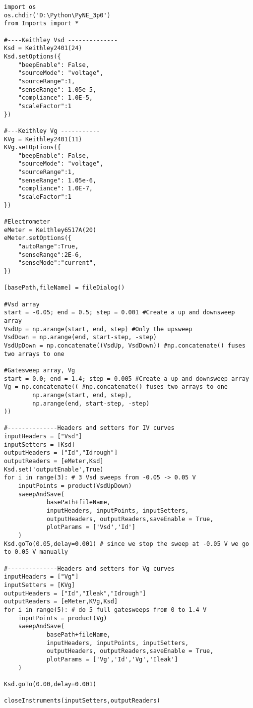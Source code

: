 \scriptsize
\begin{verbatim}
import os
os.chdir('D:\Python\PyNE_3p0')
from Imports import *

#----Keithley Vsd --------------
Ksd = Keithley2401(24)
Ksd.setOptions({
    "beepEnable": False,
    "sourceMode": "voltage",
    "sourceRange":1,
    "senseRange": 1.05e-5,
    "compliance": 1.0E-5,
    "scaleFactor":1
})

#---Keithley Vg -----------
KVg = Keithley2401(11)
KVg.setOptions({
    "beepEnable": False,
    "sourceMode": "voltage",
    "sourceRange":1,
    "senseRange": 1.05e-6,
    "compliance": 1.0E-7,
    "scaleFactor":1
})

#Electrometer
eMeter = Keithley6517A(20)
eMeter.setOptions({
    "autoRange":True,
    "senseRange":2E-6,
    "senseMode":"current",
})

[basePath,fileName] = fileDialog()

#Vsd array
start = -0.05; end = 0.5; step = 0.001 #Create a up and downsweep array
VsdUp = np.arange(start, end, step) #Only the upsweep
VsdDown = np.arange(end, start-step, -step)
VsdUpDown = np.concatenate((VsdUp, VsdDown)) #np.concatenate() fuses two arrays to one

#Gatesweep array, Vg
start = 0.0; end = 1.4; step = 0.005 #Create a up and downsweep array
Vg = np.concatenate(( #np.concatenate() fuses two arrays to one
        np.arange(start, end, step),
        np.arange(end, start-step, -step)
))

#--------------Headers and setters for IV curves
inputHeaders = ["Vsd"]
inputSetters = [Ksd]
outputHeaders = ["Id","Idrough"]
outputReaders = [eMeter,Ksd]
Ksd.set('outputEnable',True)
for i in range(3): # 3 Vsd sweeps from -0.05 -> 0.05 V
    inputPoints = product(VsdUpDown)
    sweepAndSave(
            basePath+fileName,
            inputHeaders, inputPoints, inputSetters,
            outputHeaders, outputReaders,saveEnable = True,
            plotParams = ['Vsd','Id']
    )
Ksd.goTo(0.05,delay=0.001) # since we stop the sweep at -0.05 V we go to 0.05 V manually

#--------------Headers and setters for Vg curves
inputHeaders = ["Vg"]
inputSetters = [KVg]
outputHeaders = ["Id","Ileak","Idrough"]
outputReaders = [eMeter,KVg,Ksd]
for i in range(5): # do 5 full gatesweeps from 0 to 1.4 V
    inputPoints = product(Vg)
    sweepAndSave(
            basePath+fileName,
            inputHeaders, inputPoints, inputSetters,
            outputHeaders, outputReaders,saveEnable = True,
            plotParams = ['Vg','Id','Vg','Ileak']
    )

Ksd.goTo(0.00,delay=0.001)

closeInstruments(inputSetters,outputReaders)
\end{verbatim}
\normalsize

